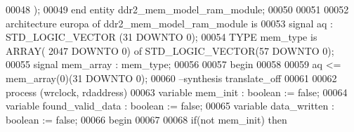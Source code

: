 \begin{DoxyCode}
00048               \textcolor{vhdlchar}{)};
00049 \textcolor{keywordflow}{end} \textcolor{keywordflow}{entity} \textcolor{vhdlchar}{ddr2\_mem\_model\_ram\_module};
00050 
00051 
00052 \textcolor{keywordflow}{architecture} europa \textcolor{keywordflow}{of} ddr2_mem_model_ram_module is
00053                 \textcolor{keywordflow}{signal} \textcolor{vhdlchar}{aq} \textcolor{vhdlchar}{:}  \textcolor{comment}{STD\_LOGIC\_VECTOR} \textcolor{vhdlchar}{(}\textcolor{vhdllogic}{}\textcolor{vhdllogic}{31} \textcolor{keywordflow}{DOWNTO} \textcolor{vhdllogic}{}\textcolor{vhdllogic}{0}\textcolor{vhdlchar}{)};
00054                 \textcolor{keywordflow}{TYPE} \textcolor{vhdlchar}{mem_type} \textcolor{keywordflow}{is} \textcolor{keywordflow}{ARRAY}\textcolor{vhdlchar}{(} \textcolor{vhdllogic}{}\textcolor{vhdllogic}{2047} \textcolor{keywordflow}{DOWNTO} \textcolor{vhdllogic}{}\textcolor{vhdllogic}{0}\textcolor{vhdlchar}{)} \textcolor{keywordflow}{of} \textcolor{comment}{STD\_LOGIC\_VECTOR}\textcolor{vhdlchar}{(}\textcolor{vhdllogic}{}\textcolor{vhdllogic}{57} \textcolor{keywordflow}{DOWNTO} \textcolor{vhdllogic}{}\textcolor{vhdllogic}{0}\textcolor{vhdlchar}{)};
00055               \textcolor{keywordflow}{signal} \textcolor{vhdlchar}{mem_array} \textcolor{vhdlchar}{:} \textcolor{vhdlchar}{mem_type};
00056 
00057 \textcolor{vhdlkeyword}{begin}
00058 
00059   \textcolor{vhdlchar}{aq} \textcolor{vhdlchar}{<=} \textcolor{vhdlchar}{mem_array}\textcolor{vhdlchar}{(}\textcolor{vhdllogic}{}\textcolor{vhdllogic}{0}\textcolor{vhdlchar}{)}\textcolor{vhdlchar}{(}\textcolor{vhdllogic}{}\textcolor{vhdllogic}{31} \textcolor{keywordflow}{DOWNTO} \textcolor{vhdllogic}{}\textcolor{vhdllogic}{0}\textcolor{vhdlchar}{)};
00060 \textcolor{keyword}{--synthesis translate\_off}
00061 
00062     \textcolor{keywordflow}{process} (wrclock, rdaddress)
00063         \textcolor{keywordflow}{variable} \textcolor{vhdlchar}{mem\_init} \textcolor{vhdlchar}{:} \textcolor{comment}{boolean} \textcolor{vhdlchar}{:=} \textcolor{vhdlchar}{false};
00064         \textcolor{keywordflow}{variable} \textcolor{vhdlchar}{found\_valid\_data} \textcolor{vhdlchar}{:} \textcolor{comment}{boolean} \textcolor{vhdlchar}{:=} \textcolor{vhdlchar}{false};
00065         \textcolor{keywordflow}{variable} \textcolor{vhdlchar}{data\_written} \textcolor{vhdlchar}{:} \textcolor{comment}{boolean} \textcolor{vhdlchar}{:=} \textcolor{vhdlchar}{false};
00066 \textcolor{vhdlkeyword}{    begin}
00067     
00068         \textcolor{keywordflow}{if}\textcolor{vhdlchar}{(}\textcolor{keywordflow}{not} \textcolor{vhdlchar}{mem\_init}\textcolor{vhdlchar}{)} \textcolor{keywordflow}{then}

\end{DoxyCode}
